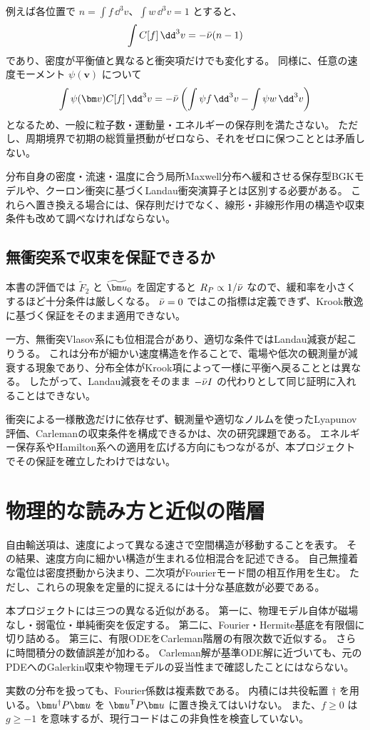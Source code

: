 例えば各位置で $n=\int f\,\dd^3v$、$\int w\,\dd^3v=1$ とすると、
\[
\int C[f]\,\dd^3v=-\nuu(n-1)
\]
であり、密度が平衡値と異なると衝突項だけでも変化する。
同様に、任意の速度モーメント $\psi(\bm v)$ について
\[
\int\psi(\bm v) C[f]\,\dd^3v
=-\nuu\left(\int\psi f\,\dd^3v-\int\psi w\,\dd^3v\right)
\]
となるため、一般に粒子数・運動量・エネルギーの保存則を満たさない。
ただし、周期境界で初期の総質量摂動がゼロなら、それをゼロに保つこととは矛盾しない。

分布自身の密度・流速・温度に合う局所Maxwell分布へ緩和させる保存型BGKモデルや、クーロン衝突に基づくLandau衝突演算子とは区別する必要がある。
これらへ置き換える場合には、保存則だけでなく、線形・非線形作用の構造や収束条件も改めて調べなければならない。

\subsection{無衝突系で収束を保証できるか}
本書の評価では $\widetilde F_2$ と $\tu_0$ を固定すると $R_P\propto1/\bar\nu$ なので、緩和率を小さくするほど十分条件は厳しくなる。
$\bar\nu=0$ ではこの指標は定義できず、Krook散逸に基づく保証をそのまま適用できない。

一方、無衝突Vlasov系にも位相混合があり、適切な条件ではLandau減衰が起こりうる。
これは分布が細かい速度構造を作ることで、電場や低次の観測量が減衰する現象であり、分布全体がKrook項によって一様に平衡へ戻ることとは異なる。
したがって、Landau減衰をそのまま $-\bar\nu I$ の代わりとして同じ証明に入れることはできない。

衝突による一様散逸だけに依存せず、観測量や適切なノルムを使ったLyapunov評価、Carlemanの収束条件を構成できるかは、次の研究課題である。
エネルギー保存系やHamilton系への適用を広げる方向にもつながるが、本プロジェクトでその保証を確立したわけではない。

\section{物理的な読み方と近似の階層}
自由輸送項は、速度によって異なる速さで空間構造が移動することを表す。
その結果、速度方向に細かい構造が生まれる位相混合を記述できる。
自己無撞着な電位は密度摂動から決まり、二次項がFourierモード間の相互作用を生む。
ただし、これらの現象を定量的に捉えるには十分な基底数が必要である。

本プロジェクトには三つの異なる近似がある。
第一に、物理モデル自体が磁場なし・弱電位・単純衝突を仮定する。
第二に、Fourier・Hermite基底を有限個に切り詰める。
第三に、有限ODEをCarleman階層の有限次数で近似する。
さらに時間積分の数値誤差が加わる。
Carleman解が基準ODE解に近づいても、元のPDEへのGalerkin収束や物理モデルの妥当性まで確認したことにはならない。

\begin{notebox}
実数の分布を扱っても、Fourier係数は複素数である。
内積には共役転置 $\dagger$ を用いる。$\uu^\dagger P\uu$ を $\uu^{\mathsf T}P\uu$ に置き換えてはいけない。
また、$f\geq0$ は $g\geq-1$ を意味するが、現行コードはこの非負性を検査していない。
\end{notebox}
